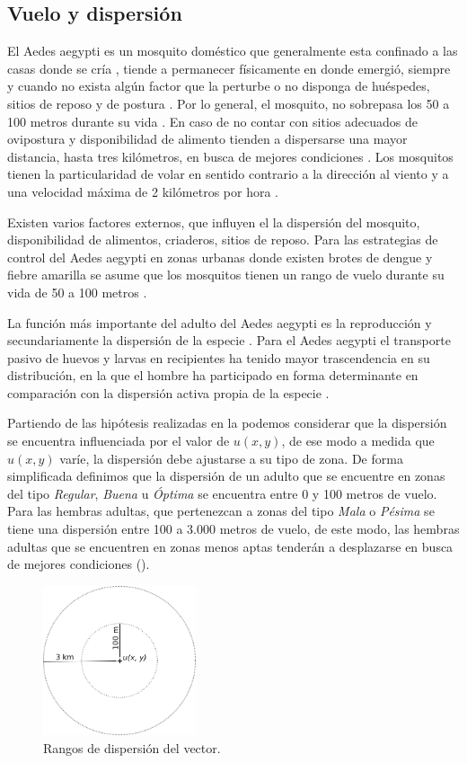 
\subsection{Vuelo y dispersión}
\label{subsec:cap4-vuelo-dispersion}
El Aedes aegypti es un mosquito doméstico que generalmente esta confinado a las casas donde se
cría \cite{luevano1993ciclo}, tiende a permanecer físicamente en donde emergió, siempre y cuando
no exista algún factor que la perturbe o no disponga de huéspedes, sitios de reposo y de postura
\cite{ThironIzcazaJ2003}. Por lo general, el mosquito, no sobrepasa los 50 a 100 metros durante su
vida \cite{cabezas2005dengue}. En caso de no contar con sitios adecuados de ovipostura y
disponibilidad de alimento tienden a dispersarse una mayor distancia, hasta tres kilómetros, en
busca de mejores condiciones \cite{ThironIzcazaJ2003}. Los mosquitos tienen la particularidad de
volar en sentido contrario a la dirección al viento \cite{ThironIzcazaJ2003,web-site:speedAnimals}
y a una velocidad máxima de 2 kilómetros por hora \cite{web-site:speedAnimals,kaufmann2004flight}.

Existen varios factores externos, que influyen el la dispersión del mosquito, disponibilidad de
alimentos, criaderos, sitios de reposo. Para las estrategias de control del Aedes aegypti en zonas
urbanas donde existen brotes de dengue y fiebre amarilla se asume que los mosquitos tienen un
rango de vuelo durante su vida de 50 a 100 metros \cite{dengueUruguayCap8}.

La función más importante del adulto del Aedes aegypti es la reproducción y secundariamente la
dispersión de la especie \cite{ThironIzcazaJ2003}. Para el Aedes aegypti el transporte pasivo de
huevos y larvas en recipientes ha tenido mayor trascendencia en su distribución, en la que el
hombre ha participado en forma determinante en comparación con la dispersión activa propia de la
especie \citep{ThironIzcazaJ2003}.

Partiendo de las hipótesis realizadas en la  podemos considerar
que la dispersión se encuentra influenciada por el valor de $u(x,y)$, de ese modo a medida que
$u(x,y)$ varíe, la dispersión debe ajustarse a su tipo de zona. De forma simplificada definimos que
la dispersión de un adulto que se encuentre en zonas del tipo \textit{Regular}, \textit{Buena} u
\textit{Óptima} se encuentra entre 0 y 100 metros de vuelo. Para las hembras adultas, que
pertenezcan a zonas del tipo \textit{Mala} o \textit{Pésima} se tiene una dispersión entre 100 a
3.000 metros de vuelo, de este modo, las hembras adultas que se encuentren en zonas menos aptas
tenderán a desplazarse en busca de mejores condiciones ().

\begin{figure}[!hptb]
\centering
\includegraphics[width=0.4\textwidth]{capitulo-4/graphics/rango-vuelo.png}
\caption{\label{fig:cap4-dispersion} Rangos de dispersión del vector.}
\end{figure}
